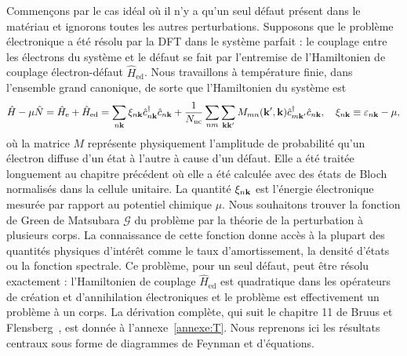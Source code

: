 Commençons par le cas idéal où il n'y a qu'un seul défaut présent dans le matériau et ignorons toutes les autres perturbations. Supposons que le problème électronique a été résolu par la DFT dans le système parfait : le couplage entre les électrons du système et le défaut se fait par l'entremise de l'Hamiltonien de couplage électron-défaut $\hat H_\text{ed}$. Nous travaillons à température finie, dans l'ensemble grand canonique, de sorte que l'Hamiltonien du système est
\begin{equation}
    \hat{H}-\mu\hat{N} = \hat{H}_\text{e}+\hat{H}_\text{ed} = \sum_{n\mathbf{k}}\xi_{n\mathbf{k}}\hat{c}^\dag_{n\mathbf{k}}\hat{c}_{n\mathbf{k}}+\frac{1}{N_\text{uc}}\sum_{nm}\sum_{\mathbf{k}\mathbf{k}'}M_{mn}(\mathbf{k}',\mathbf{k})\hat{c}^\dag_{m\mathbf{k}'}\hat{c}_{n\mathbf{k}},\quad\xi_{n\mathbf{k}} \equiv \varepsilon_{n\mathbf{k}}-\mu,
\end{equation}
où la matrice $M$ représente physiquement l'amplitude de probabilité qu'un électron diffuse d'un état à l'autre à cause d'un défaut. Elle a été traitée longuement au chapitre précédent où elle a été calculée avec des états de Bloch normalisés dans la cellule unitaire. La quantité $\xi_{n\mathbf{k}}$ est l'énergie électronique mesurée par rapport au potentiel chimique $\mu$. Nous souhaitons trouver la fonction de Green de Matsubara $\mathcal{G}$ du problème par la théorie de la perturbation à plusieurs corps. La connaissance de cette fonction donne accès à la plupart des quantités physiques d'intérêt comme le taux d'amortissement, la densité d'états ou la fonction spectrale. Ce problème, pour un seul défaut, peut être résolu exactement : l'Hamiltonien de couplage $\hat H_\text{ed}$ est quadratique dans les opérateurs de création et d'annihilation électroniques et le problème est effectivement un problème à un corps. La dérivation complète, qui suit le chapitre 11 de Bruus et Flensberg~\cite{bruusManyBodyQuantumTheory2004}, est donnée à l'annexe~\ref{annexe:T}. Nous reprenons ici les résultats centraux sous forme de diagrammes de Feynman et d'équations.


